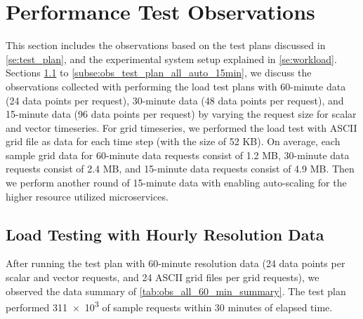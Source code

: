 \section{Performance Test Observations}
\label{se:observations}

This section includes the observations based on the test plans discussed in \cref{se:test_plan}, and the experimental system setup explained in \cref{se:workload}. Sections \ref{subse:obs_test_plan_all_60min} to \ref{subse:obs_test_plan_all_auto_15min}, we discuss the observations collected with performing the load test plans with 60-minute data (24 data points per request), 30-minute data (48 data points per request), and 15-minute data (96 data points per request) by varying the request size for scalar and vector timeseries. For grid timeseries, we performed the load test with ASCII grid file as data for each time step (with the size of 52 KB). On average, each sample grid data for 60-minute data requests consist of 1.2 MB, 30-minute data requests consist of 2.4 MB, and 15-minute data requests consist of 4.9 MB. Then we perform another round of 15-minute data with enabling auto-scaling for the higher resource utilized microservices.

\subsection{Load Testing with Hourly Resolution Data}
\label{subse:obs_test_plan_all_60min}

After running the test plan with 60-minute resolution data (24 data points per scalar and vector requests, and 24 ASCII grid files per grid requests), we observed the data summary of \cref{tab:obs_all_60_min_summary}. The test plan performed \num{311e3} of sample requests within 30 minutes of elapsed time.

